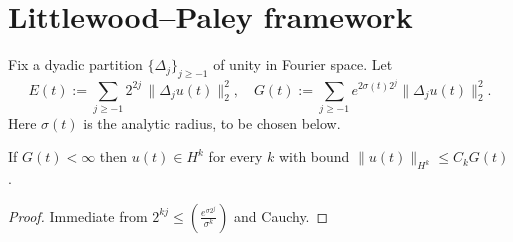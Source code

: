 \section{Littlewood–Paley framework}\label{NS:setup}

Fix a dyadic partition $\{\Delta_{j}\}_{j\ge-1}$ of unity in Fourier
space.  Let
\[
E(t):=\sum_{j\ge-1} 2^{2j}\,\|\Delta_{j}u(t)\|_{2}^{2},
\quad
G(t):=\sum_{j\ge-1} e^{2\sigma(t)2^{j}}\|\Delta_{j}u(t)\|_{2}^{2}.
\]
Here $\sigma(t)$ is the analytic radius, to be chosen below.

\begin{lemma}\label{NS:gevrey-sobolev}
If $G(t)<\infty$ then $u(t)\in H^{k}$ for every $k$ with bound
$\|u(t)\|_{H^{k}}\le C_{k}G(t)$.
\end{lemma}

\begin{proof}
Immediate from $2^{kj}\le (\tfrac{e^{\sigma 2^{j}}}{\sigma^{k}})$ and Cauchy.
\end{proof} 